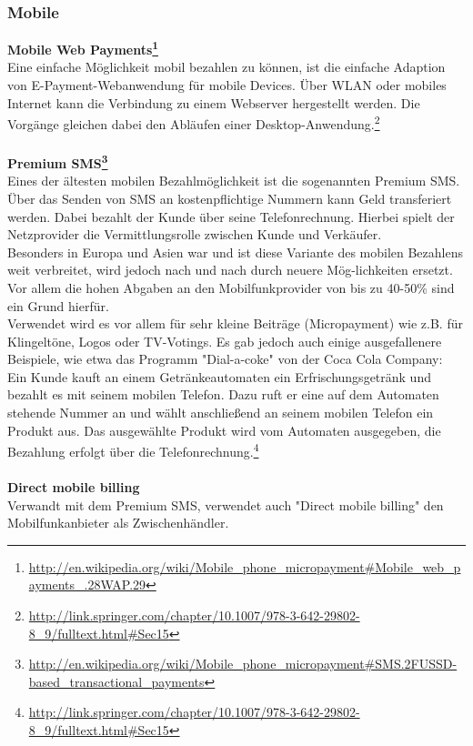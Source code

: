 \subsubsection{Mobile}
\textbf{Mobile Web Payments\footnote{\url{http://en.wikipedia.org/wiki/Mobile_phone_micropayment\#Mobile_web_payments_.28WAP.29}}}\\
Eine einfache Möglichkeit mobil bezahlen zu können, ist die einfache Adaption von E-Payment-Webanwendung für mobile Devices. Über WLAN oder mobiles Internet kann die Verbindung zu einem Webserver hergestellt werden. Die Vorgänge gleichen dabei den Abläufen einer Desktop-Anwendung.\footnote{\url{http://link.springer.com/chapter/10.1007/978-3-642-29802-8_9/fulltext.html\#Sec15}}\\
\\
\textbf{Premium SMS\footnote{\url{http://en.wikipedia.org/wiki/Mobile_phone_micropayment\#SMS.2FUSSD-based_transactional_payments}}}\\
Eines der ältesten mobilen Bezahlmöglichkeit ist die sogenannten Premium SMS. Über das Senden von SMS an kostenpflichtige Nummern kann Geld transferiert werden. Dabei bezahlt der Kunde über seine Telefonrechnung. Hierbei spielt der Netzprovider die Vermittlungsrolle zwischen Kunde und Verkäufer.\\
Besonders in Europa und Asien war und ist diese Variante des mobilen Bezahlens weit verbreitet, wird jedoch nach und nach durch neuere Mög-lichkeiten ersetzt. Vor allem die hohen Abgaben an den Mobilfunkprovider von bis zu 40-50\% sind ein Grund hierfür.\\
Verwendet wird es vor allem für sehr kleine Beiträge (Micropayment) wie z.B. für Klingeltöne, Logos oder TV-Votings. Es gab jedoch auch einige ausgefallenere Beispiele, wie etwa das Programm "Dial-a-coke" von der Coca Cola Company: Ein Kunde kauft an einem Getränkeautomaten ein Erfrischungsgetränk und bezahlt es mit seinem mobilen Telefon. Dazu ruft er eine auf dem Automaten stehende Nummer an und wählt anschließend an seinem mobilen Telefon ein Produkt aus. Das ausgewählte Produkt wird vom Automaten ausgegeben, die Bezahlung erfolgt über die Telefonrechnung.\footnote{\url{http://link.springer.com/chapter/10.1007/978-3-642-29802-8_9/fulltext.html\#Sec15}}\\
\\
\textbf{Direct mobile billing}\\
Verwandt mit dem Premium SMS, verwendet auch "Direct mobile billing" den Mobilfunkanbieter als Zwischenhändler.\\
